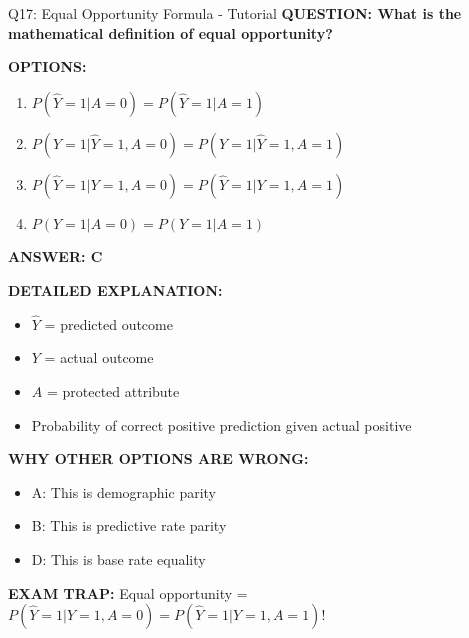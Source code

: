 \documentclass[8pt]{beamer}
\begin{document}
	\begin{frame}{Q17: Equal Opportunity Formula - Tutorial}
		\fontsize{6.5}{7.5}\selectfont
		\textbf{QUESTION: What is the mathematical definition of equal opportunity?}
		
		\vspace{0.1cm}
		\textbf{OPTIONS:}
		\begin{enumerate}
			\item $P(\hat{Y}=1|A=0) = P(\hat{Y}=1|A=1)$
			\item $P(Y=1|\hat{Y}=1,A=0) = P(Y=1|\hat{Y}=1,A=1)$
			\item $P(\hat{Y}=1|Y=1,A=0) = P(\hat{Y}=1|Y=1,A=1)$
			\item $P(Y=1|A=0) = P(Y=1|A=1)$
		\end{enumerate}
		
		\vspace{0.1cm}
		\textcolor{myblue}{\textbf{ANSWER: C}}
		
		\vspace{0.1cm}
		\textbf{DETAILED EXPLANATION:}
		\begin{itemize}
			\item $\hat{Y}$ = predicted outcome
			\item $Y$ = actual outcome
			\item $A$ = protected attribute
			\item Probability of correct positive prediction given actual positive
		\end{itemize}
		
		\vspace{0.1cm}
		\textcolor{myred}{\textbf{WHY OTHER OPTIONS ARE WRONG:}}
		\begin{itemize}
			\item \textcolor{myred}{A:} This is demographic parity
			\item \textcolor{myred}{B:} This is predictive rate parity
			\item \textcolor{myred}{D:} This is base rate equality
		\end{itemize}
		
		\textcolor{myred}{\textbf{EXAM TRAP:}} Equal opportunity = \textcolor{myblue}{$P(\hat{Y}=1|Y=1,A=0) = P(\hat{Y}=1|Y=1,A=1)$}!
	\end{frame}
	
\end{document}
